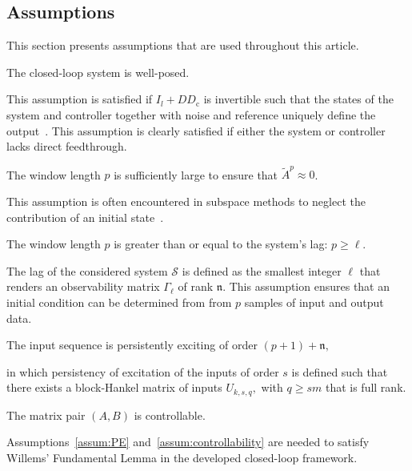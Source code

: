 \subsection{Assumptions}
This section presents assumptions that are used throughout this article.
\begin{assum}\label{assum:well_posed}
    The closed-loop system is well-posed.
\end{assum}
This assumption is satisfied if $I_l+DD_\mathrm{c}$ is invertible such that the states of the system and controller together with noise and reference uniquely define the output~\citep{VanOverschee1997}. This assumption is clearly satisfied if either the system or controller lacks direct feedthrough.
\begin{assum}\label{assum:initial_contribution}
    The window length $p$ is sufficiently large to ensure that $\tilde{A}^p\approx0$.
\end{assum}
This assumption is often encountered in subspace methods to neglect the contribution of an initial state~\citep{Chiuso2007}.
\begin{assum}\label{assum:unique_initial}
    The window length $p$ is greater than or equal to the system's lag: $p\geq\ell$.
\end{assum}
The lag of the considered system $\mathcal{S}$ is defined as the smallest integer $\ell$ that renders an observability matrix $\Gamma_\ell$ of rank $\mathfrak{n}$. This assumption ensures that an initial condition can be determined from from $p$ samples of input and output data.
\begin{assum}\label{assum:PE}
    The input sequence is persistently exciting of order $(p+1)+\mathfrak{n},$
\end{assum}
in which persistency of excitation of the inputs of order $s$ is defined such that there exists a block-Hankel matrix of inputs $U_{k,s,q},$ with $q\geq sm$ that is full rank.
\begin{assum}\label{assum:controllability}
    The matrix pair $(A,B)$ is controllable.
\end{assum}
Assumptions~\ref{assum:PE} and~\ref{assum:controllability} are needed to satisfy Willems' Fundamental Lemma in the developed closed-loop framework.